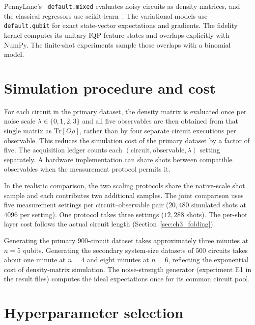 \documentclass[Thesis.tex]{subfiles}
\begin{document}
PennyLane's~\cite{bergholm2018pennylane} \texttt{default.mixed} evaluates noisy
circuits as density matrices, and the classical regressors use
scikit-learn~\cite{pedregosa2011scikit}.
The variational models use \texttt{default.qubit} for exact state-vector
expectations and gradients. The fidelity kernel computes its unitary IQP
feature states and overlaps explicitly with NumPy. The finite-shot experiments
sample those overlaps with a binomial model.

\section{Simulation procedure and cost}

For each circuit in the primary dataset, the density matrix is evaluated once per noise scale
$\lambda \in \{0, 1, 2, 3\}$ and all five observables are then obtained from that
single matrix as $\mathrm{Tr}[O \rho]$, rather than by four separate circuit
executions per observable. This reduces the simulation cost of the primary dataset
by a factor of five. The acquisition ledger counts each
$(\text{circuit}, \text{observable}, \lambda)$ setting separately. A hardware
implementation can share shots between compatible observables when the
measurement protocol permits it.

In the realistic comparison, the two scaling protocols share the native-scale
shot sample and each contributes two additional samples. The joint comparison
uses five measurement settings per circuit--observable pair ($20{,}480$
simulated shots at $4096$ per setting). One protocol takes three settings
($12{,}288$ shots). The per-shot layer cost follows the actual circuit length
(Section~\ref{sec:ch3_folding}).

Generating the primary $900$-circuit dataset takes approximately three minutes at
$n = 5$ qubits. Generating the secondary system-size datasets of $500$ circuits
takes about one minute at $n = 4$ and eight minutes at $n = 6$, reflecting the exponential cost of density-matrix simulation. The noise-strength generator
(experiment E1 in the result files) computes the ideal expectations once for its common
circuit pool.

\section{Hyperparameter selection}
\end{document}
